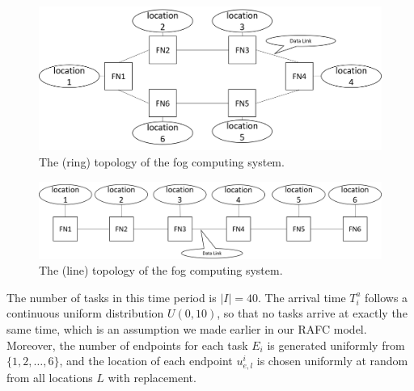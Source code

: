 \documentclass[11pt]{phdthesis}
\begin{document}
\begin{figure}
    \centering
    \includegraphics[width=1.0\textwidth]{./Figures/system_topology_ring.png}
    \caption{\label{fig: ring topology}The (ring) topology of the fog computing system.}
\end{figure}

\begin{figure}
    \centering
    \includegraphics[width=1.0\textwidth]{./Figures/system_topology_line.png}
    \caption{\label{fig: line topology}The (line) topology of the fog computing system.}
\end{figure}

The number of tasks in this time period is $|I| = 40$. The arrival time $T_i^a$ follows a continuous uniform distribution $ U(0, 10) $, so that no tasks arrive at exactly the same time, which is an assumption we made earlier in our RAFC model. Moreover, the number of endpoints for each task $E_i$ is generated uniformly from $ \{ 1,2,\ldots,6 \} $, and the location of each endpoint $u_{e,l}^i$ is chosen uniformly at random from all locations $L$ with replacement.
\end{document}
